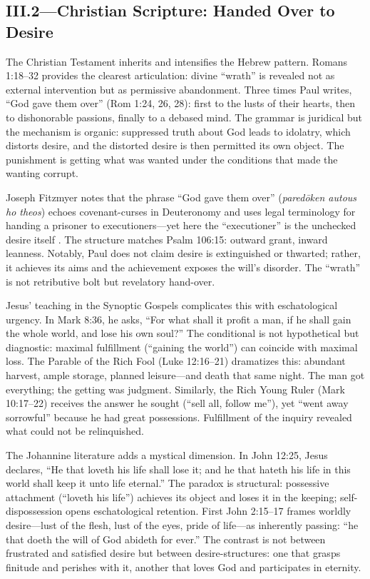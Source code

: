 \subsection*{III.2—Christian Scripture: Handed Over to Desire}
\label{ssec:iii-christian-scripture}

The Christian Testament inherits and intensifies the Hebrew pattern. Romans 1:18--32 provides
the clearest articulation: divine ``wrath'' is revealed not as external intervention but as
permissive abandonment. Three times Paul writes, ``God gave them over'' (Rom 1:24, 26, 28):
first to the lusts of their hearts, then to dishonorable passions, finally to a debased mind.
The grammar is juridical but the mechanism is organic: suppressed truth about God leads to
idolatry, which distorts desire, and the distorted desire is then permitted its own object.
The punishment is getting what was wanted under the conditions that made the wanting corrupt.

Joseph Fitzmyer notes that the phrase ``God gave them over'' (\emph{paredōken autous ho theos})
echoes covenant-curses in Deuteronomy and uses legal terminology for handing a prisoner to
executioners---yet here the ``executioner'' is the unchecked desire itself
\parencite{FitzmyerRomans1993}. The structure matches Psalm 106:15: outward grant, inward
leanness. Notably, Paul does not claim desire is extinguished or thwarted; rather, it achieves
its aims and the achievement exposes the will's disorder. The ``wrath'' is not retributive
bolt but revelatory hand-over.

Jesus' teaching in the Synoptic Gospels complicates this with eschatological urgency. In Mark
8:36, he asks, ``For what shall it profit a man, if he shall gain the whole world, and lose
his own soul?'' The conditional is not hypothetical but diagnostic: maximal fulfillment
(``gaining the world'') can coincide with maximal loss. The Parable of the Rich Fool (Luke
12:16--21) dramatizes this: abundant harvest, ample storage, planned leisure---and death that
same night. The man got everything; the getting was judgment. Similarly, the Rich Young Ruler
(Mark 10:17--22) receives the answer he sought (``sell all, follow me''), yet ``went away
sorrowful'' because he had great possessions. Fulfillment of the inquiry revealed what could
not be relinquished.

The Johannine literature adds a mystical dimension. In John 12:25, Jesus declares, ``He that
loveth his life shall lose it; and he that hateth his life in this world shall keep it unto
life eternal.'' The paradox is structural: possessive attachment (``loveth his life'') achieves
its object and loses it in the keeping; self-dispossession opens eschatological retention.
First John 2:15--17 frames worldly desire---lust of the flesh, lust of the eyes, pride of
life---as inherently passing: ``he that doeth the will of God abideth for ever.'' The contrast
is not between frustrated and satisfied desire but between desire-structures: one that grasps
finitude and perishes with it, another that loves God and participates in eternity.

